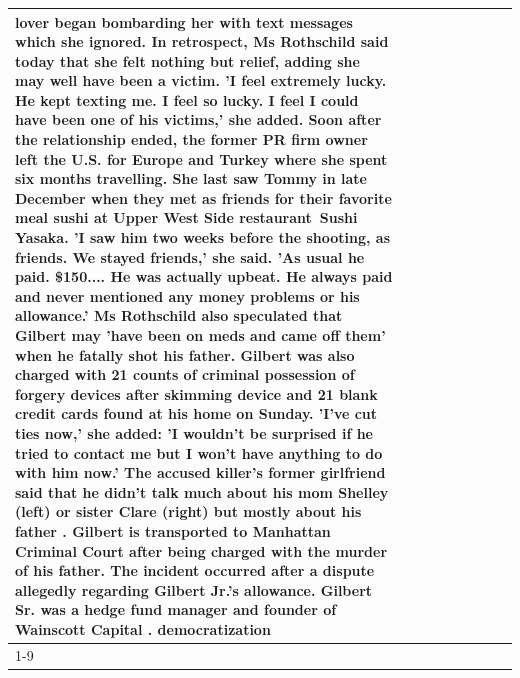 \begin{table}[H]
\begin{tabular}{lllrlllll}
lover began bombarding her with text messages which she ignored. In retrospect, Ms Rothschild said today that she felt nothing but relief, adding she may well have been a victim. 'I feel extremely lucky. He kept texting me. I feel so lucky. I feel I could have been one of his victims,' she added. Soon after the relationship ended, the former PR firm owner left the U.S. for Europe and Turkey where she spent six months  travelling. She last saw Tommy in late December when they met as friends for their favorite meal sushi at Upper West Side restaurant Sushi Yasaka. 'I saw him two weeks before the shooting, as friends. We stayed friends,' she said. 'As usual he paid. \$150.... He was actually upbeat. He always paid and never mentioned any money problems or his allowance.' Ms Rothschild also speculated that Gilbert may 'have been on meds and came off them' when he fatally shot his father. Gilbert was also charged with 21 counts of criminal possession of forgery devices after skimming device and 21 blank credit cards found at his home on Sunday. 'I've cut ties now,' she added: 'I wouldn’t be surprised if he tried to contact me but I won’t have anything to do with him now.' The accused killer's former girlfriend said that he didn't talk much about his mom Shelley (left) or sister Clare (right) but mostly about his father . Gilbert is transported to Manhattan Criminal Court  after being charged with the murder of his father. The incident occurred after a dispute allegedly regarding Gilbert Jr.'s allowance. Gilbert Sr. was a hedge fund manager and founder of Wainscott Capital . democratization \\
\cline{1-9}

\end{tabular}
\end{table}
